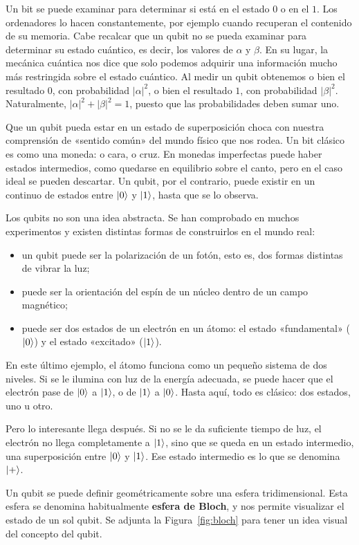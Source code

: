 Un bit se puede examinar para determinar si está en el estado $0$ o en el $1$. Los ordenadores
lo hacen constantemente, por ejemplo cuando recuperan el contenido de su memoria. Cabe recalcar
que un qubit no se pueda examinar para determinar su estado cuántico, es decir, los
valores de $\alpha$ y $\beta$. En su lugar, la mecánica cuántica nos dice que solo podemos
adquirir una información mucho más restringida sobre el estado cuántico. Al medir un qubit
obtenemos o bien el resultado $0$, con probabilidad $|\alpha|^2$, o bien el resultado $1$, con
probabilidad $|\beta|^2$. Naturalmente, $|\alpha|^2 + |\beta|^2 = 1$, puesto que las
probabilidades deben sumar uno.

Que un qubit pueda estar en un estado de superposición choca con nuestra comprensión de
«sentido común» del mundo físico que nos rodea. Un bit clásico es como una moneda: o cara,
o cruz. En monedas imperfectas puede haber estados intermedios, como quedarse en equilibrio
sobre el canto, pero en el caso ideal se pueden descartar. Un qubit, por el contrario, puede
existir en un continuo de estados entre $\ket{0}$ y $\ket{1}$, hasta que se lo observa.

Los qubits no son una idea
abstracta. Se han comprobado en muchos experimentos y existen distintas formas de
construirlos en el mundo real:
\begin{itemize}
    \item un qubit puede ser la polarización de un fotón, esto es, dos formas distintas de
          vibrar la luz;
    \item puede ser la orientación del espín de un núcleo dentro de un campo magnético;
    \item puede ser dos estados de un electrón en un átomo: el estado «fundamental»
          ($\ket{0}$) y el estado «excitado» ($\ket{1}$).
\end{itemize}

En este último ejemplo, el átomo funciona como un pequeño sistema de dos niveles. Si se le
ilumina con luz de la energía adecuada, se puede hacer que el electrón pase de $\ket{0}$ a
$\ket{1}$, o de $\ket{1}$ a $\ket{0}$. Hasta aquí, todo es clásico: dos estados, uno u otro.

Pero lo interesante llega después. Si no se le da suficiente tiempo de luz, el electrón no
llega completamente a $\ket{1}$, sino que se queda en un estado intermedio, una superposición
entre $\ket{0}$ y $\ket{1}$. Ese estado intermedio es lo que se denomina $\ket{+}$.

Un qubit se puede definir geométricamente sobre una esfera tridimensional. Esta esfera se denomina habitualmente
\textbf{esfera de Bloch}, y nos permite visualizar el estado de un sol qubit. Se adjunta la Figura~\ref{fig:bloch} para tener un idea visual del concepto del qubit.

